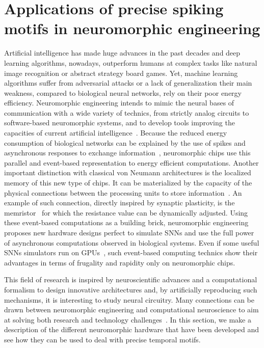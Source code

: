 \documentclass[brainsci, %
               review,submit,pdftex,moreauthors
               ]{Definitions/mdpi}
\begin{document}
\section{Applications of precise spiking motifs in neuromorphic engineering}
\label{sec:neuromorphic}
%
Artificial intelligence has made huge advances in the past decades and deep learning algorithms, nowadays, outperform humans at complex tasks like natural image recognition or abstract strategy board games. Yet, machine learning algorithms suffer from adversarial attacks or a lack of generalization  their main weakness, compared to biological neural networks, rely on their poor energy efficiency. Neuromorphic engineering intends to mimic the neural bases of communication with a wide variety of technics, from strictly analog circuits to software-based neuromorphic systems, and to develop tools improving the capacities of current artificial intelligence~\citep{roy_towards_2019, javanshir_advancements_2022}. Because the reduced energy consumption of biological networks can be explained  by the use of spikes and asynchronous responses to exchange information~\citep{maass_networks_1997}, neuromorphic chips use this parallel and event-based representation to  energy efficient computations. Another important distinction with classical von Neumann architectures is the localized memory of this new type of chips. It can be materialized by the capacity of the physical connections between the processing units to store information~\citep{markovic_physics_2020}. An example of such connection, directly inspired by synaptic plasticity, is the memristor~\citep{rasetto_challenges_2022} for which the resistance value can be dynamically adjusted. Using these event-based computations as a building brick, neuromorphic engineering proposes new hardware designs perfect to simulate SNNs and use the full power of asynchronous computations observed in biological systems. Even if some useful SNNs simulators run on GPUs~\citep{diesmann_nest_2003, hazan_bindsnet_2018, stimberg_brian_2019}, such event-based computing technics show their advantages in terms of frugality and rapidity only on neuromorphic chips. 

This field of research is inspired by neuroscientific advances and a computational formalism to design innovative architectures and, by artificially reproducing such mechanisms, it is interesting to study neural circuitry. Many connections can be drawn between neuromorphic engineering and computational neuroscience to aim at solving both research and technology challenges~\citep{zenke_visualizing_2021}. In this section, we make a description of the different neuromorphic hardware that have been developed and see how they can be used to deal with precise temporal motifs. 
%
\end{document}
